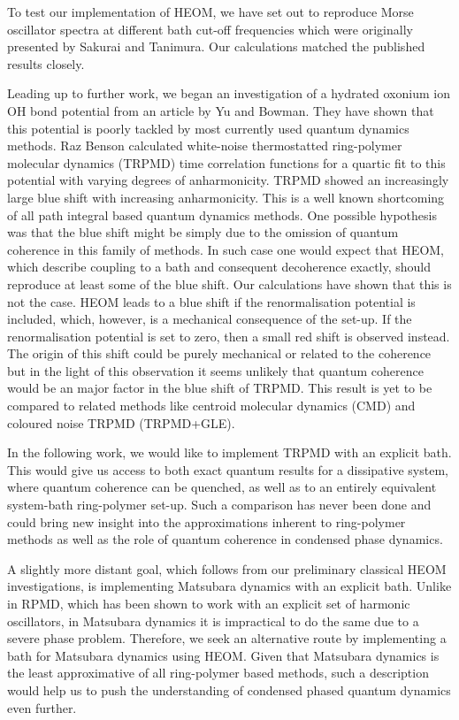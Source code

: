 To test our implementation of HEOM, we have set out to reproduce Morse oscillator spectra at different bath cut-off frequencies which were originally presented by Sakurai and Tanimura.\supercite{Sakurai2011} Our calculations matched the published results closely.

Leading up to further work, we began an investigation of a hydrated oxonium ion OH bond potential from an article by Yu and Bowman.\supercite{Yu2019} They have shown that this potential is poorly tackled by most currently used quantum dynamics methods. Raz Benson calculated white-noise thermostatted ring-polymer molecular dynamics (TRPMD) time correlation functions for a quartic fit to this potential with varying degrees of anharmonicity. TRPMD showed an increasingly large blue shift with increasing anharmonicity. This is a well known shortcoming of all path integral based quantum dynamics methods. One possible hypothesis was that the blue shift might be simply due to the omission of quantum coherence in this family of methods. In such case one would expect that HEOM, which describe coupling to a bath and consequent decoherence exactly, should reproduce at least some of the blue shift. Our calculations have shown that this is not the case. HEOM leads to a blue shift if the renormalisation potential is included, which, however, is a mechanical consequence of the set-up. If the renormalisation potential is set to zero, then a small red shift is observed instead. The origin of this shift could be purely mechanical or related to the coherence but in the light of this observation it seems unlikely that quantum coherence would be an major factor in the blue shift of TRPMD. This result is yet to be compared to related methods like centroid molecular dynamics (CMD)\supercite{Cao1994h, Jang1999a} and coloured noise TRPMD (TRPMD+GLE).\supercite{Rossi2018}

In the following work, we would like to implement TRPMD with an explicit bath. This would give us access to both exact quantum results for a dissipative system, where quantum coherence can be quenched, as well as to an entirely equivalent system-bath ring-polymer set-up. Such a comparison has never been done and could bring new insight into the approximations inherent to ring-polymer methods as well as the role of quantum coherence in condensed phase dynamics.

A slightly more distant goal, which follows from our preliminary classical HEOM investigations, is implementing Matsubara dynamics with an explicit bath. Unlike in RPMD, which has been shown to work with an explicit set of harmonic oscillators,\supercite{Craig2005b} in Matsubara dynamics it is impractical to do the same due to a severe phase problem.\supercite{Hele2015} Therefore, we seek an alternative route by implementing a bath for Matsubara dynamics using HEOM. Given that Matsubara dynamics is the least approximative of all ring-polymer based methods, such a description would help us to push the understanding of condensed phased quantum dynamics even further.
